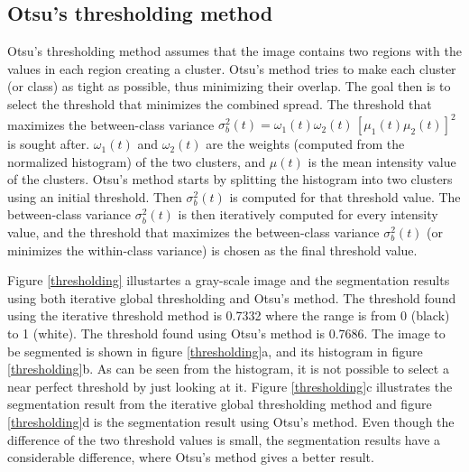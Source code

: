 \subsection{Otsu's thresholding method}
Otsu's thresholding method assumes that the image contains two regions with the values in each region creating a cluster. Otsu's method tries to make each cluster (or class) as tight as possible, thus minimizing their overlap. The goal then is to select the threshold that minimizes the combined spread. The threshold that maximizes the between-class variance \(\sigma_{b}^2(t) = \omega_{1}(t)\omega_{2}(t)\,[\mu_{1}(t)\mu_{2}(t)]^2\) is sought after. \(\omega_{1}(t)\) and \(\omega_{2}(t)\) are the weights (computed from the normalized histogram) of the two clusters, and \(\mu(t)\) is the mean intensity value of the clusters. Otsu's method starts by splitting the histogram into two clusters using an initial threshold. Then \(\sigma_{b}^2(t)\) is computed for that threshold value. The between-class variance \(\sigma_{b}^2(t)\) is then iteratively computed for every intensity value, and the threshold that maximizes the between-class variance \(\sigma_{b}^2(t)\) (or minimizes the within-class variance) is chosen as the final threshold value.

Figure \ref{thresholding} illustartes a gray-scale image and the segmentation results using both iterative global thresholding and Otsu's method. The threshold found using the iterative threshold method is 0.7332 where the range is from 0 (black) to 1 (white). The threshold found using Otsu's method is 0.7686. The image to be segmented is shown in figure \ref{thresholding}a, and its histogram in figure \ref{thresholding}b. As can be seen from the histogram, it is not possible to select a near perfect threshold by just looking at it. Figure \ref{thresholding}c illustrates the segmentation result from the iterative global thresholding method and figure \ref{thresholding}d is the segmentation result using Otsu's method. Even though the difference of the two threshold values is small, the segmentation results have a considerable difference, where Otsu's method gives a better result.


